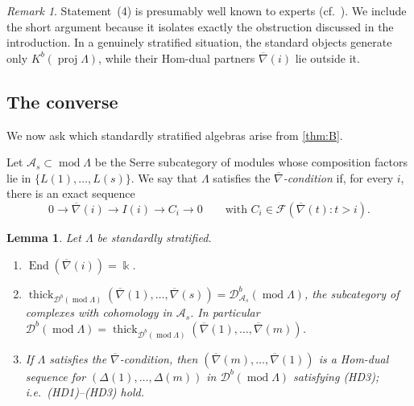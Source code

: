 \documentclass[11pt,reqno]{amsart}
\theoremstyle{plain}
\newtheorem{lemma}[theorem]{Lemma}
\theoremstyle{definition}
\theoremstyle{remark}
\newtheorem{remark}[theorem]{Remark}
\newcommand{\kk}{\Bbbk}
\DeclareMathOperator{\End}{End}
\newcommand{\modd}{\operatorname{mod}}
\newcommand{\proj}{\operatorname{proj}}
\newcommand{\Db}{\mathcal{D}^b}
\newcommand{\Kb}{K^b}
\newcommand{\thick}[2][\cD]{\operatorname{thick}_{#1}(#2)}
\newcommand{\nablabar}{\overline{\nabla}}
\newcommand{\cD}{\mathcal{D}}
\newcommand{\cA}{\mathcal{A}}
\newcommand{\cF}{\mathcal{F}}
\begin{document}
\begin{remark}
Statement~(4) is presumably well known to experts (cf.\ \cite{AHLU00,Dla96}). We include the short argument because it isolates exactly the obstruction discussed in the introduction. In a genuinely stratified situation, the standard objects generate only $\Kb(\proj\Lambda)$, while their Hom-dual partners $\nablabar(i)$ lie outside it.
\end{remark}

\subsection{The converse}
We now ask which standardly stratified algebras arise from \cref{thm:B}.

Let $\cA_s\subset\modd\Lambda$ be the Serre subcategory of modules whose composition factors lie in $\{L(1),\dots,L(s)\}$. We say that $\Lambda$ satisfies the \emph{$\nablabar$-condition} if, for every $i$, there is an exact sequence
\[0\to\nablabar(i)\to I(i)\to C_i\to0\qquad\text{with } C_i\in\cF(\nablabar(t):t>i).\]

\begin{lemma}\label{lem:nablabar}
Let $\Lambda$ be standardly stratified.
\begin{enumerate}
\item $\End(\nablabar(i))=\kk$.
\item $\thick[\Db(\modd\Lambda)]{\nablabar(1),\dots,\nablabar(s)}=\Db_{\cA_s}(\modd\Lambda)$, the subcategory of complexes with cohomology in $\cA_s$. In particular $\Db(\modd\Lambda)=\thick[\Db(\modd\Lambda)]{\nablabar(1),\dots,\nablabar(m)}$.
\item If $\Lambda$ satisfies the $\nablabar$-condition, then $(\nablabar(m),\dots,\nablabar(1))$ is a Hom-dual sequence for $(\Delta(1),\dots,\Delta(m))$ in $\Db(\modd\Lambda)$ satisfying (HD3); i.e.\ (HD1)--(HD3) hold.
\end{enumerate}
\end{lemma}
\end{document}
